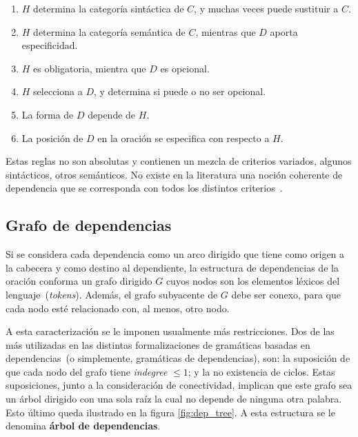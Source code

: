 \begin{enumerate}
	\item $H$ determina la categoría sintáctica de $C$, y muchas veces puede sustituir a $C$.
	
	\item $H$ determina la categoría semántica de $C$, mientras que $D$ aporta especificidad.
	
	\item $H$ es obligatoria, mientra que $D$ es opcional.
	
	\item $H$ selecciona a $D$, y determina si puede o no ser opcional.
	
	\item La forma de $D$ depende de $H$.
	
	\item La posición de $D$ en la oración se especifica con respecto a $H$.
\end{enumerate}

Estas reglas no son absolutas y contienen un mezcla de criterios variados, algunos sintácticos, otros semánticos.
No existe en la literatura una noción coherente de dependencia que se corresponda con todos los distintos criterios~\cite{nivre2005dependency}.


\subsection{Grafo de dependencias}

Si se considera cada dependencia como un arco dirigido que tiene como origen a la cabecera y como destino al dependiente, la estructura de dependencias de la oración conforma un grafo dirigido $G$ cuyos nodos son los elementos léxicos del lenguaje~(\emph{tokens}).
Además, el grafo subyacente de $G$ debe ser conexo, para que cada nodo esté relacionado con, al menos, otro nodo.

A esta caracterización se le imponen usualmente más restricciones.
Dos de las más utilizadas en las distintas formalizaciones de gramáticas basadas en dependencias~(o simplemente, gramáticas de dependencias), son: la suposición de que cada nodo del grafo tiene \emph{indegree} $\leq 1$; y la no existencia de ciclos.
Estas suposiciones, junto a la consideración de conectividad, implican que este grafo sea un árbol dirigido con una sola raíz la cual no depende de ninguna otra palabra.
Esto último queda ilustrado en la figura \ref{fig:dep_tree}.
A esta estructura se le denomina \textbf{árbol de dependencias}.


